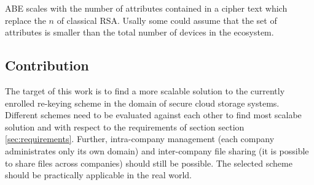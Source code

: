 ABE scales with the number of attributes contained in a cipher text which replace the $n$ of classical RSA. Usally some could assume that the set of attributes is smaller than the total number of devices in the ecosystem. 

\subsection{Contribution}
The target of this work is to find a more scalable solution to the currently enrolled re-keying scheme in the domain of secure cloud storage systems. Different schemes need to be evaluated against each other to find most scalabe solution and with respect to the requirements of section section \ref{sec:requirements}. Further, intra-company management (each company administrates only its own domain) and inter-company file sharing (it is possible to share files across companies) should still be possible. The selected scheme should be practically applicable in the real world.